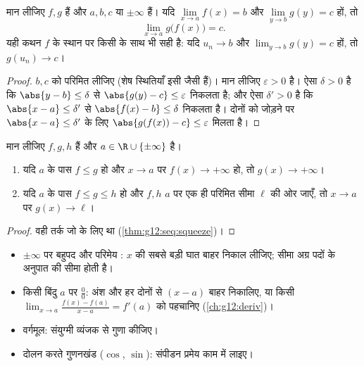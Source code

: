 \begin{theorem}[संयोजन की सीमा]\label{thm:g12:limcont:composition}
मान लीजिए $f, g$  हैं और $a, b, c$  या $\pm\infty$ हैं। यदि $\lim\limits_{x \to a} f(x) = b$ और
$\lim\limits_{y \to b} g(y) = c$ हों, तो
\[
\lim_{x \to a} g\bigl(f(x)\bigr) = c .
\]
यही कथन $f$ के स्थान पर किसी  के साथ भी सही है: यदि $u_n \to b$ और $\lim_{y\to b} g(y) = c$ हों,
तो $g(u_n) \to c$।
\end{theorem}

\begin{proof}
$b, c$ को परिमित लीजिए (शेष स्थितियाँ इसी जैसी हैं)। मान लीजिए $\varepsilon > 0$ है। ऐसा
$\delta > 0$ है कि $\abs{y - b} \leq \delta$ से $\abs{g(y) - c} \leq \varepsilon$ निकलता है; और ऐसा $\delta' > 0$ है कि $\abs{x - a} \leq \delta'$ से $\abs{f(x) - b} \leq \delta$ निकलता
है। दोनों को जोड़ने पर $\abs{x - a} \leq \delta'$ के लिए $\abs{g(f(x)) - c} \leq \varepsilon$ मिलता है।
\end{proof}

\begin{theorem}[तुलना और संपीडन]\label{thm:g12:limcont:squeeze}
मान लीजिए $f, g, h$  हैं और $a \in \R \cup \{\pm\infty\}$ है।
\begin{enumerate}
  \item यदि $a$ के पास $f \leq g$ हो और $x \to a$ पर $f(x) \to +\infty$ हो, तो $g(x) \to +\infty$।
  \item यदि $a$ के पास $f \leq g \leq h$ हो और $f, h$ $a$ पर एक ही परिमित सीमा $\ell$
        की ओर जाएँ, तो $x \to a$ पर $g(x) \to \ell$।
\end{enumerate}
\end{theorem}

\begin{proof}
वही तर्क जो  के लिए था (\cref{thm:g12:seq:squeeze})।
\end{proof}

\begin{method}[व्यवहार में सीमाएँ निकालना]\label{met:g12:limcont:limits}
\begin{itemize}
  \item $\pm\infty$ पर बहुपद और परिमेय : $x$ की सबसे बड़ी घात बाहर निकाल
        लीजिए; सीमा अग्र पदों के अनुपात की सीमा होती है।
  \item किसी बिंदु $a$ पर $\frac{0}{0}$: अंश और हर दोनों से $(x-a)$ बाहर निकालिए,
        या किसी  $\lim_{x\to a}\frac{f(x)-f(a)}{x-a} = f'(a)$ को पहचानिए (\cref{ch:g12:deriv})।
  \item वर्गमूल: संयुग्मी व्यंजक से गुणा कीजिए।
  \item दोलन करते गुणनखंड ($\cos$, $\sin$): संपीडन प्रमेय काम में लाइए।
\end{itemize}
\end{method}

